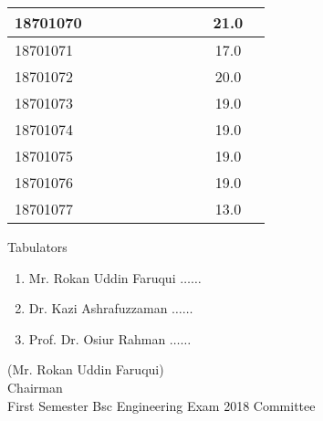 \documentclass[12pt]{article}
\begin{document}
\begin{center}
\begin{small}
\begin{tabular}{|l|c|c|c|c|c|c|c|c|c|c|}
18701070 &  &  &  &  &  &  &  &  & 21.0\\ \hline 
18701071 &  &  &  &  &  &  &  &  & 17.0\\ \hline 
18701072 &  &  &  &  &  &  &  &  & 20.0\\ \hline 
18701073 &  &  &  &  &  &  &  &  & 19.0\\ \hline 
18701074 &  &  &  &  &  &  &  &  & 19.0\\ \hline 
18701075 &  &  &  &  &  &  &  &  & 19.0\\ \hline 
18701076 &  &  &  &  &  &  &  &  & 19.0\\ \hline 
18701077 &  &  &  &  &  &  &  &  & 13.0\\ \hline 
        \end{tabular}
            \end{small}
            \end{center}
  \centering
            
            \begin{table}[hb]
            	\centering
            \begin{minipage}[b]{0.5\linewidth} %
            {\centering Tabulators }
            \begin{enumerate}
                \item Mr. Rokan Uddin Faruqui \hspace*{1ex} $\ldots \ldots  $  
                \item Dr. Kazi Ashrafuzzaman \hspace*{1ex} $\ldots \ldots  $  
                \item Prof. Dr. Osiur Rahman \hspace*{1ex} $\ldots \ldots $  
            \end{enumerate} 

            \end{minipage}
            \hspace*{1.2cm}
            \begin{minipage}[b]{0.4\linewidth} \centering
            (Mr. Rokan Uddin Faruqui) \\
            Chairman  \hspace*{1ex} \\
           First Semester Bsc Engineering Exam 2018 Committee
            \end{minipage}
            \end{table}
            \clearpage
            \clearpage
            
\end{document}
